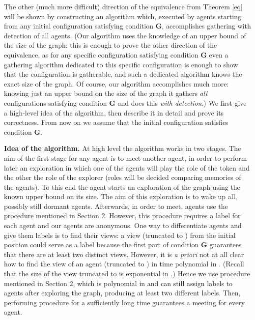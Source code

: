 \documentclass[11pt]{article}
\begin{document}
 The other (much more difficult) direction of the equivalence from Theorem \ref{eq} will be shown by constructing an algorithm which, 
 executed by agents starting from any initial
 configuration satisfying condition {\bf G}, accomplishes gathering with detection of all agents. (Our algorithm uses the knowledge of an upper bound  of the size
 of the graph: this is enough to prove the other direction of the equivalence, as for any specific configuration satisfying condition {\bf G} even a gathering
 algorithm dedicated to this specific configuration is enough to show that the configuration is gatherable, and such a dedicated algorithm knows the exact size
 of the graph. Of course, our algorithm accomplishes much more: knowing just an upper bound on the size of the graph it gathers {\em all} configurations satisfying condition {\bf G} and does this {\em with detection}.) We first give a high-level idea of the algorithm, then describe
 it in detail and prove its correctness. From now on we assume that the initial configuration satisfies condition {\bf G}.
 
 \vspace*{0.3cm}
 \noindent
 {\bf Idea of the algorithm.}
 At high level the algorithm works in two stages. The aim of the first stage for any agent is to meet another agent, in order to perform later an exploration 
 in which one of the agents will play the role of the token and the other the role of the explorer (roles will be decided comparing memories of the agents).
 To this end the agent starts an exploration of the graph using the known upper bound  on its size. The aim of this exploration is to wake up all, possibly still dormant
 agents. Afterwards,  in order to meet, 
 agents use the procedure  mentioned in Section 2. 
 However, this procedure requires a label  for each agent and our agents are anonymous. One way to differentiate agents
 and give them labels is to find their views: a view (truncated to ) from the initial position could serve as a label because the first part of condition {\bf G} guarantees
 that there are at least two distinct views. However, it is {\em a priori} not at all clear how to find the view of an agent (truncated to ) in time polynomial in .
 (Recall that the size of the view truncated to  is exponential in .) Hence we use
 procedure  mentioned in Section 2, which is polynomial in  and can still assign labels to agents {after exploring the graph}, producing at least two different labels. 
 Then, performing procedure  for a sufficiently long time guarantees a meeting for every agent.
 
\end{document}
